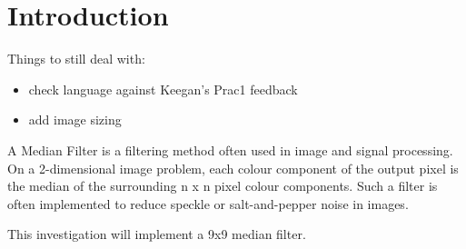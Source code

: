 \section{Introduction}
Things to still deal with:
\begin{itemize}
	\item check language against Keegan's Prac1 feedback
	\item add image sizing
\end{itemize}
A Median Filter is a filtering method often used in image and signal processing. On a 2-dimensional image problem, each colour component of the output pixel is the median of the surrounding n x n pixel colour components. Such a filter is often implemented to reduce speckle or salt-and-pepper noise in images\cite{NSP}.

This investigation will implement a 9x9 median filter.

